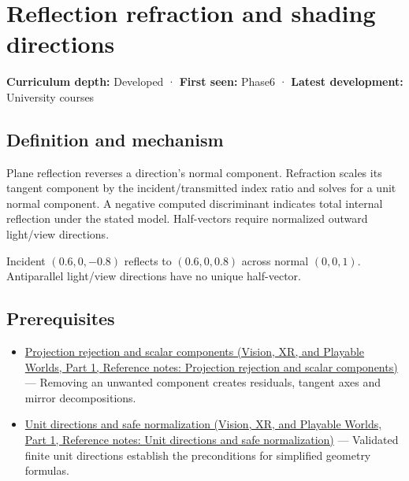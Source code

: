 \hypertarget{appendix-44e00863b4d5}{}\label{referencestart:appendix-44e00863b4d5}
\section{Reflection refraction and shading directions}\label{appendix-44e00863b4d5-reflection-refraction-and-shading-directions}

\hypertarget{appendix-44e00863b4d5-reflection-refraction-and-shading-directions}{}

\textbf{Curriculum depth:} Developed · \textbf{First seen:} Phase6 · \textbf{Latest development:} University courses

\begin{allmightroledefinition}

\subsection{Definition and mechanism}\label{appendix-44e00863b4d5-definition-and-mechanism}

\hypertarget{appendix-44e00863b4d5-definition-and-mechanism}{}

Plane reflection reverses a direction's normal component. Refraction scales its tangent component by the incident/transmitted index ratio and solves for a unit normal component. A negative computed discriminant indicates total internal reflection under the stated model. Half-vectors require normalized outward light/view directions.

\end{allmightroledefinition}

Incident \((0.6,0,-0.8)\) reflects to \((0.6,0,0.8)\) across normal \((0,0,1)\). Antiparallel light/view directions have no unique half-vector.

\subsection{Prerequisites}\label{appendix-44e00863b4d5-prerequisites}

\hypertarget{appendix-44e00863b4d5-prerequisites}{}

\begin{itemize}
\tightlist
\item
  \href{../07-Vision-XR-and-Playable-Worlds-P01/main.pdf\#appendix-505a502c372a}{Projection rejection and scalar components (Vision, XR, and Playable Worlds, Part 1, Reference notes: Projection rejection and scalar components)} --- Removing an unwanted component creates residuals, tangent axes and mirror decompositions.
\item
  \href{../07-Vision-XR-and-Playable-Worlds-P01/main.pdf\#appendix-f744e41b95b4}{Unit directions and safe normalization (Vision, XR, and Playable Worlds, Part 1, Reference notes: Unit directions and safe normalization)} --- Validated finite unit directions establish the preconditions for simplified geometry formulas.
\end{itemize}

